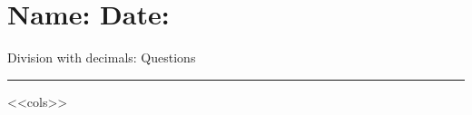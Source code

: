 \documentclass[leqno, 12pt]{article}
\def \HeadingQuestions {\section*{\Huge Name: \underline{\hspace{8cm}} \hfill Date: \underline{\hspace{3cm}}}
{Division with decimals: Questions} \vspace{1pt}\hrule}
\begin{document}
    \HeadingQuestions
    \vspace{-5mm}
    \begin{multicols}{2}
        <<cols>>
    \end{multicols}
\end{document}
